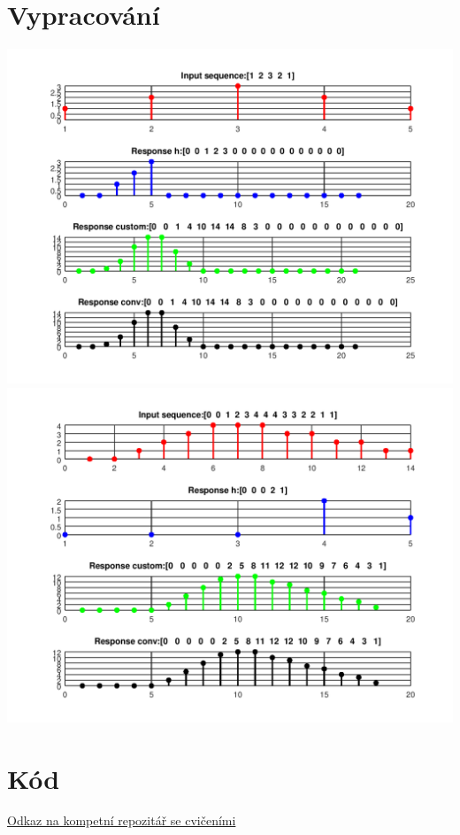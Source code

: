 \documentclass{article}
\begin{document}
\section{Vypracování}
\includegraphics[scale=0.75]{../assets/img1.png}
\includegraphics[scale=0.75]{../assets/img2.png}
\section{Kód}

\href{https://github.com/AleshR/AP8ZS}{Odkaz na kompetní repozitář se cvičeními}
\end{document}
